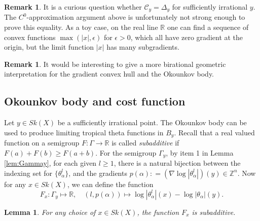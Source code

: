 \documentclass[a4paper]{article}
\newtheorem{lem}[thm]{Lemma}
\theoremstyle{definition}
\newtheorem{rmk}[thm]{Remark}
\newcommand{\R}{\mathbb{R}}
\newcommand{\Z}{\mathbb{Z}}
\newcommand{\N}{\mathbb{N}}
\begin{document}
	
	
	
	
	\begin{rmk}
	It is a curious question whether $\mathcal{C}_y=\Delta_y$ for sufficiently irrational $y$. The $C^0$-approximation argument above is unfortunately not strong enough to prove this equality. As a toy case, on the real line $\R$ one can find a sequence of convex functions $\max( |x|, \epsilon)$ for $\epsilon>0$, which all have zero gradient at the origin, but the limit function $|x|$ has many subgradients. 
	\end{rmk}
	
	\begin{rmk}
	It would be interesting to give a more birational geometric interpretation for the gradient convex hull and the Okounkov body.
	\end{rmk}
	
	
	
	
	
	
	
	
	\subsection{Okounkov body and cost function}\label{sec:Okounkovcost}
	
	
	Let $y\in Sk(X)$ be a sufficiently irrational point.
	The Okounkov body can be used to produce limiting tropical theta functions in $B_y$.
Recall that a real valued function on a semigroup $F:\Gamma\to \R$ is called \emph{subadditive} if 
$
		 F (a) + F (b) \geq F (a + b).
$
	For the semigroup $\Gamma_y$, by item 1 in Lemma \ref{lem:Gammay}, for each given $l\geq 1$, there is a natural bijection between the indexing set for $\{   \theta_\alpha^l \}$, and the gradients $p(\alpha): =( \nabla \log |\theta_\alpha^l | )(y)\in \Z^n$. Now for any $x\in Sk(X)$, we can define the function  
	\[
	F_x:  \Gamma_y\mapsto \R,\quad 	(l, p(\alpha)) \mapsto \log |\theta_\alpha^l|(x)- \log |\theta_\alpha|(y).
	\]
	
	
	

	

	
	\begin{lem}
		For any choice of $x\in Sk(X)$, the function $F_x$ is subadditive.
\end{lem}
\end{document}
